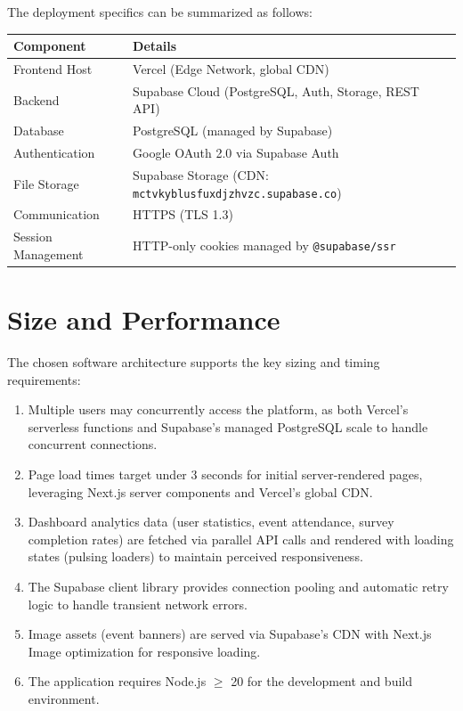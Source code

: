 \documentclass[11pt,a4paper]{article}
\begin{document}
\vspace{0.5em}
\noindent The deployment specifics can be summarized as follows:

\begin{table}[h!]
\centering
\small
\renewcommand{\arraystretch}{1.4}
\begin{tabular}{|p{3.5cm}|p{9.5cm}|}
\hline
\textbf{Component} & \textbf{Details} \\ \hline
Frontend Host & Vercel (Edge Network, global CDN) \\ \hline
Backend & Supabase Cloud (PostgreSQL, Auth, Storage, REST API) \\ \hline
Database & PostgreSQL (managed by Supabase) \\ \hline
Authentication & Google OAuth 2.0 via Supabase Auth \\ \hline
File Storage & Supabase Storage (CDN: \texttt{mctvkyblusfuxdjzhvzc.supabase.co}) \\ \hline
Communication & HTTPS (TLS 1.3) \\ \hline
Session Management & HTTP-only cookies managed by \texttt{@supabase/ssr} \\ \hline
\end{tabular}
\end{table}


\section{Size and Performance}
\label{sec:size_performance}

The chosen software architecture supports the key sizing and timing requirements:

\begin{enumerate}[leftmargin=1.5em]
  \item Multiple users may concurrently access the platform, as both Vercel's serverless functions and Supabase's managed PostgreSQL scale to handle concurrent connections.
  \item Page load times target under 3 seconds for initial server-rendered pages, leveraging Next.js server components and Vercel's global CDN.
  \item Dashboard analytics data (user statistics, event attendance, survey completion rates) are fetched via parallel API calls and rendered with loading states (pulsing loaders) to maintain perceived responsiveness.
  \item The Supabase client library provides connection pooling and automatic retry logic to handle transient network errors.
  \item Image assets (event banners) are served via Supabase's CDN with Next.js Image optimization for responsive loading.
  \item The application requires Node.js $\geq$ 20 for the development and build environment.
\end{enumerate}
\end{document}
